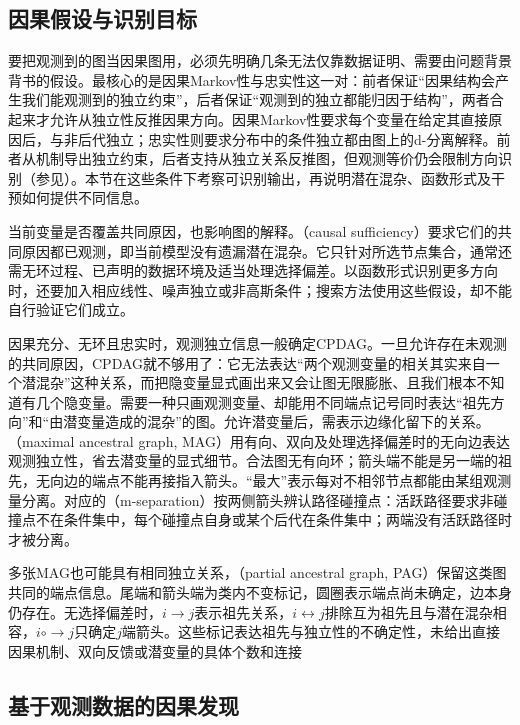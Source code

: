 \subsection{因果假设与识别目标}
\label{sec:pgm-structure-learning-causal-assumptions}

要把观测到的图当因果图用，必须先明确几条无法仅靠数据证明、需要由问题背景背书的假设。最核心的是因果Markov性与忠实性这一对：前者保证“因果结构会产生我们能观测到的独立约束”，后者保证“观测到的独立都能归因于结构”，两者合起来才允许从独立性反推因果方向。因果Markov性要求每个变量在给定其直接原因后，与非后代独立；忠实性则要求分布中的条件独立都由图上的d-分离解释。前者从机制导出独立约束，后者支持从独立关系反推图，但观测等价仍会限制方向识别（参见）。本节在这些条件下考察可识别输出，再说明潜在混杂、函数形式及干预如何提供不同信息。

当前变量是否覆盖共同原因，也影响图的解释。（causal sufficiency）要求它们的共同原因都已观测，即当前模型没有遗漏潜在混杂。它只针对所选节点集合，通常还需无环过程、已声明的数据环境及适当处理选择偏差。以函数形式识别更多方向时，还要加入相应线性、噪声独立或非高斯条件；搜索方法使用这些假设，却不能自行验证它们成立。

因果充分、无环且忠实时，观测独立信息一般确定CPDAG。一旦允许存在未观测的共同原因，CPDAG就不够用了：它无法表达“两个观测变量的相关其实来自一个潜混杂”这种关系，而把隐变量显式画出来又会让图无限膨胀、且我们根本不知道有几个隐变量。需要一种只画观测变量、却能用不同端点记号同时表达“祖先方向”和“由潜变量造成的混杂”的图。允许潜变量后，需表示边缘化留下的关系。（maximal ancestral graph, MAG）用有向、双向及处理选择偏差时的无向边表达观测独立性，省去潜变量的显式细节。合法图无有向环；箭头端不能是另一端的祖先，无向边的端点不能再接指入箭头。“最大”表示每对不相邻节点都能由某组观测量分离。对应的（m-separation）按两侧箭头辨认路径碰撞点：活跃路径要求非碰撞点不在条件集中，每个碰撞点自身或某个后代在条件集中；两端没有活跃路径时才被分离。

多张MAG也可能具有相同独立关系，（partial ancestral graph, PAG）保留这类图共同的端点信息。尾端和箭头端为类内不变标记，圆圈表示端点尚未确定，边本身仍存在。无选择偏差时，$i\to j$表示祖先关系，$i\leftrightarrow j$排除互为祖先且与潜在混杂相容，$i\mathbin{\circ\!\!\to}j$只确定$j$端箭头。这些标记表达祖先与独立性的不确定性，未给出直接因果机制、双向反馈或潜变量的具体个数和连接

\subsection{基于观测数据的因果发现}
\label{sec:pgm-structure-learning-observational}

